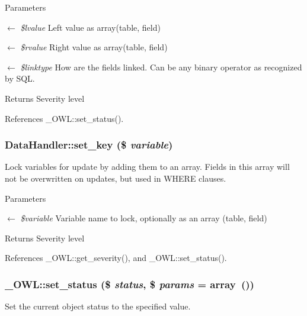 \begin{DoxyParams}{Parameters}
\item[\mbox{$\leftarrow$} {\em \$lvalue}]Left value as array(table, field) \item[\mbox{$\leftarrow$} {\em \$rvalue}]Right value as array(table, field) \item[\mbox{$\leftarrow$} {\em \$linktype}]How are the fields linked. Can be any binary operator as recognized by SQL. \end{DoxyParams}
\begin{DoxyReturn}{Returns}
Severity level 
\end{DoxyReturn}


References \_\-OWL::set\_\-status().

\subsubsection[{set\_\-key}]{\setlength{\rightskip}{0pt plus 5cm}DataHandler::set\_\-key (\$ {\em variable})}\label{classDataHandler_a32ce223478b78a4ea9838a3c6ac7440c}
Lock variables for update by adding them to an array. Fields in this array will not be overwritten on updates, but used in WHERE clauses. 
\begin{DoxyParams}{Parameters}
\item[\mbox{$\leftarrow$} {\em \$variable}]Variable name to lock, optionally as an array (table, field) \end{DoxyParams}
\begin{DoxyReturn}{Returns}
Severity level 
\end{DoxyReturn}


References \_\-OWL::get\_\-severity(), and \_\-OWL::set\_\-status().

\subsubsection[{set\_\-status}]{\setlength{\rightskip}{0pt plus 5cm}\_\-OWL::set\_\-status (\$ {\em status}, \/  \$ {\em params} = {\ttfamily array~()})}\label{class__OWL_aea912d0ede9b3c2a69b79072d94d4787}
Set the current object status to the specified value.


